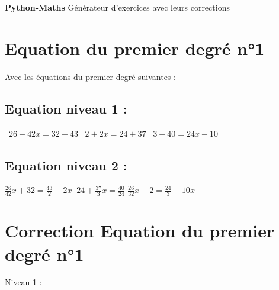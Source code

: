 \documentclass{article}%
\begin{document}
%
\normalsize%
\pagestyle{header}%
\begin{minipage}{\textwidth}%
\centering%
\vspace*{200pt}%
\fontsize{50}{36}%
\selectfont%
\textbf{Python{-}Maths}%
\linebreak%
\fontsize{30}{24}%
\selectfont%
Générateur d'exercices avec leurs corrections%
\end{minipage}%
\newpage%
\fontsize{12}{10}%
\selectfont%
\section*{Equation du premier degré n°1}%
\label{sec:Equationdupremierdegrn1}%
Avec les équations du premier degré suivantes : %
\subsection*{Equation niveau 1 : }%
\label{subsec:Equationniveau1}%
\ $26 - 42x = 32 + 43 $%
\vspace{5mm}%
\newline%
\ $2 + 2x  = 24 + 37$%
\vspace{5mm}%
\newline%
\ $3 + 40 = 24x - 10$

%
\subsection*{Equation niveau 2 : }%
\label{subsec:Equationniveau2}%
$\frac{26}{42}x + 32 = \frac{43}{2} - 2x$%
\vspace{5mm}%
\newline%
$\ 24 + \frac{37}{3}x = \frac{40}{24}$%
\vspace{5mm}%
\newline%
$\frac{26}{32}x - 2 = \frac{24}{3} - 10x$%
\vspace{5mm}%
\newline

%
\newpage%
\section*{Correction Equation du premier degré n°1}%
\label{sec:CorrectionEquationdupremierdegrn1}%
Niveau 1 :%
\end{document}
